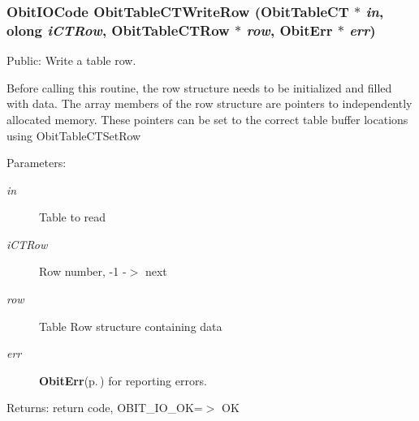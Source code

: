 \subsubsection{\setlength{\rightskip}{0pt plus 5cm}Obit\-IOCode Obit\-Table\-CTWrite\-Row ({\bf Obit\-Table\-CT} $\ast$ {\em in}, {\bf olong} {\em i\-CTRow}, {\bf Obit\-Table\-CTRow} $\ast$ {\em row}, {\bf Obit\-Err} $\ast$ {\em err})}\label{ObitTableCT_8c_a24}


Public: Write a table row. 

Before calling this routine, the row structure needs to be initialized and filled with data. The array members of the row structure are pointers to independently allocated memory. These pointers can be set to the correct table buffer locations using Obit\-Table\-CTSet\-Row \begin{Desc}
\item[Parameters:]
\begin{description}
\item[{\em in}]Table to read \item[{\em i\-CTRow}]Row number, -1 -$>$ next \item[{\em row}]Table Row structure containing data \item[{\em err}]{\bf Obit\-Err}{\rm (p.\,\pageref{structObitErr})} for reporting errors. \end{description}
\end{Desc}
\begin{Desc}
\item[Returns:]return code, OBIT\_\-IO\_\-OK=$>$ OK \end{Desc}
